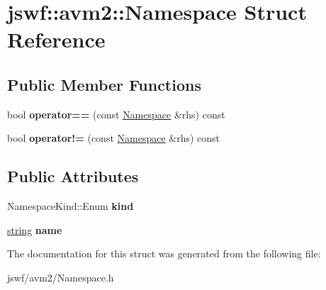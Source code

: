 \hypertarget{structjswf_1_1avm2_1_1_namespace}{\section{jswf\+:\+:avm2\+:\+:Namespace Struct Reference}
\label{structjswf_1_1avm2_1_1_namespace}
}
\subsection*{Public Member Functions}
\begin{DoxyCompactItemize}
\item 
\hypertarget{structjswf_1_1avm2_1_1_namespace_a1b472ce2b8702d0ddf267efe77be1287}{bool {\bfseries operator==} (const \hyperlink{structjswf_1_1avm2_1_1_namespace}{Namespace} \&rhs) const }\label{structjswf_1_1avm2_1_1_namespace_a1b472ce2b8702d0ddf267efe77be1287}

\item 
\hypertarget{structjswf_1_1avm2_1_1_namespace_aafb688482e05572d30aef1a32223db32}{bool {\bfseries operator!=} (const \hyperlink{structjswf_1_1avm2_1_1_namespace}{Namespace} \&rhs) const }\label{structjswf_1_1avm2_1_1_namespace_aafb688482e05572d30aef1a32223db32}

\end{DoxyCompactItemize}
\subsection*{Public Attributes}
\begin{DoxyCompactItemize}
\item 
\hypertarget{structjswf_1_1avm2_1_1_namespace_a77ed642d45f378cc58563c2975311c91}{Namespace\+Kind\+::\+Enum {\bfseries kind}}\label{structjswf_1_1avm2_1_1_namespace_a77ed642d45f378cc58563c2975311c91}

\item 
\hypertarget{structjswf_1_1avm2_1_1_namespace_ad9273b78cc67a2bbf514febb7c72691f}{\hyperlink{namespacejswf_a755127d61081aa8af105eb800aa2c1ec}{string} {\bfseries name}}\label{structjswf_1_1avm2_1_1_namespace_ad9273b78cc67a2bbf514febb7c72691f}

\end{DoxyCompactItemize}


The documentation for this struct was generated from the following file\+:\begin{DoxyCompactItemize}
\item 
jswf/avm2/Namespace.\+h\end{DoxyCompactItemize}

